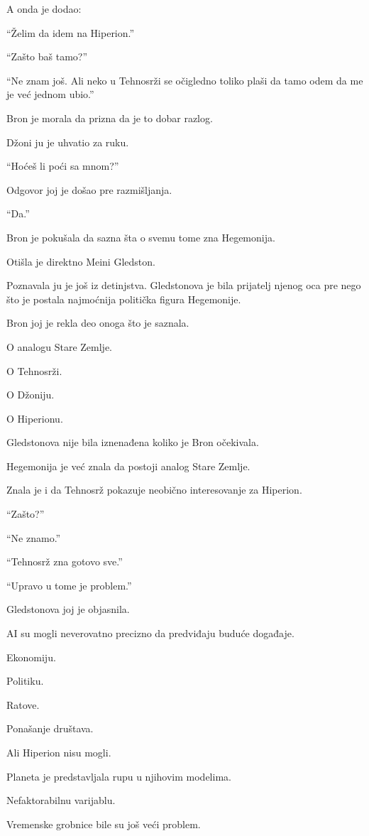 A onda je dodao:

``Želim da idem na Hiperion.''

``Zašto baš tamo?''

``Ne znam još. Ali neko u Tehnosrži se očigledno toliko plaši da tamo odem da me je već jednom ubio.''

Bron je morala da prizna da je to dobar razlog.

Džoni ju je uhvatio za ruku.

``Hoćeš li poći sa mnom?''

Odgovor joj je došao pre razmišljanja.

``Da.''

\bigskip

Bron je pokušala da sazna šta o svemu tome zna Hegemonija.

Otišla je direktno Meini Gledston.

Poznavala ju je još iz detinjstva. Gledstonova je bila prijatelj njenog oca pre nego što je postala najmoćnija politička figura Hegemonije.

Bron joj je rekla deo onoga što je saznala.

O analogu Stare Zemlje.

O Tehnosrži.

O Džoniju.

O Hiperionu.

Gledstonova nije bila iznenađena koliko je Bron očekivala.

Hegemonija je već znala da postoji analog Stare Zemlje.

Znala je i da Tehnosrž pokazuje neobično interesovanje za Hiperion.

``Zašto?''

``Ne znamo.''

``Tehnosrž zna gotovo sve.''

``Upravo u tome je problem.''

Gledstonova joj je objasnila.

AI su mogli neverovatno precizno da predviđaju buduće događaje.

Ekonomiju.

Politiku.

Ratove.

Ponašanje društava.

Ali Hiperion nisu mogli.

Planeta je predstavljala rupu u njihovim modelima.

Nefaktorabilnu varijablu.

Vremenske grobnice bile su još veći problem.


